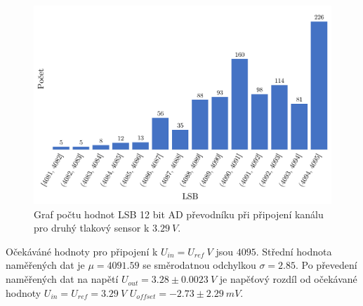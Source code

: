 \begin{figure}[H]
    \caption{Graf počtu hodnot LSB 12 bit AD převodníku při připojení kanálu pro druhý tlakový sensor k $3.29 \ V$.}
    \label{fig:hist_vacuum2_3_3}
    \includegraphics[width=1\textwidth]{graphs/vacuum2_33.png}

\end{figure}
Očekáváné hodnoty pro připojení k $U_{in} = U_{ref} \ V$ jsou $4095$. Střední hodnota naměřených dat je $\mu = 4091.59$ se směrodatnou odchylkou $\sigma = 2.85$. Po převedení naměřených dat na napětí $U_{out} = 3.28 \pm 0.0023 \ V$ je napěťový rozdíl od očekávané hodnoty $U_{in} = U_{ref} = 3.29 \ V$
$U_{offset} = -2.73 \pm 2.29 \ mV$.